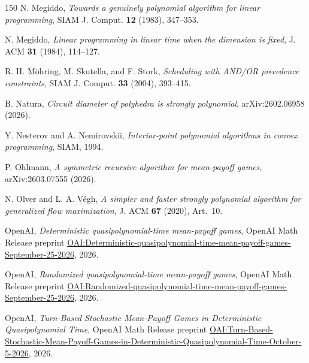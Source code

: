 \begin{thebibliography}{150}
N. Megiddo, \emph{Towards a genuinely polynomial algorithm for linear programming}, SIAM J. Comput. \textbf{12} (1983), 347--353.

N. Megiddo, \emph{Linear programming in linear time when the dimension is fixed}, J. ACM \textbf{31} (1984), 114--127.

R. H. M\"ohring, M. Skutella, and F. Stork, \emph{Scheduling with AND/OR precedence constraints}, SIAM J. Comput. \textbf{33} (2004), 393--415.

B. Natura, \emph{Circuit diameter of polyhedra is strongly polynomial}, arXiv:2602.06958 (2026).

Y. Nesterov and A. Nemirovskii, \emph{Interior-point polynomial algorithms in convex programming}, SIAM, 1994.

P. Ohlmann, \emph{A symmetric recursive algorithm for mean-payoff games}, arXiv:2603.07555 (2026).

N. Olver and L. A. V\'egh, \emph{A simpler and faster strongly polynomial algorithm for generalized flow maximization}, J. ACM \textbf{67} (2020), Art.~10.

{\raggedright OpenAI, \emph{Deterministic quasipolynomial-time mean-payoff games},
OpenAI Math Release preprint
\href{https://github.com/openai/math/blob/main/preprints/Deterministic-quasipolynomial-time-mean-payoff-games-September-25-2026/paper.pdf}{{\ttfamily OAI:Deterministic-\allowbreak{}quasipolynomial-\allowbreak{}time-\allowbreak{}mean-\allowbreak{}payoff-\allowbreak{}games-\allowbreak{}September-\allowbreak{}25-\allowbreak{}2026}}, 2026.\par}

{\raggedright OpenAI, \emph{Randomized quasipolynomial-time mean-payoff games},
OpenAI Math Release preprint
\href{https://github.com/openai/math/blob/main/preprints/Randomized-quasipolynomial-time-mean-payoff-games-September-25-2026/paper.pdf}{{\ttfamily OAI:Randomized-\allowbreak{}quasipolynomial-\allowbreak{}time-\allowbreak{}mean-\allowbreak{}payoff-\allowbreak{}games-\allowbreak{}September-\allowbreak{}25-\allowbreak{}2026}}, 2026.\par}

{\raggedright OpenAI, \emph{Turn-Based Stochastic Mean-Payoff Games in Deterministic Quasipolynomial Time},
OpenAI Math Release preprint
\href{https://github.com/openai/math/blob/main/preprints/Turn-Based-Stochastic-Mean-Payoff-Games-in-Deterministic-Quasipolynomial-Time-October-5-2026/stochastic-mean-payoff-games.pdf}{{\ttfamily OAI:Turn-\allowbreak{}Based-\allowbreak{}Stochastic-\allowbreak{}Mean-\allowbreak{}Payoff-\allowbreak{}Games-\allowbreak{}in-\allowbreak{}Deterministic-\allowbreak{}Quasipolynomial-\allowbreak{}Time-\allowbreak{}October-\allowbreak{}5-\allowbreak{}2026}}, 2026.\par}


\end{thebibliography}
